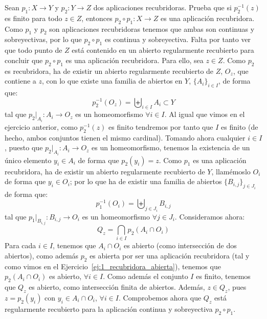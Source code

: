 \begin{ejercicio}
    Sean $p_1:X\to Y$ y $p_2:Y\to Z$ dos aplicaciones recubridoras. Prueba que si $p_2^{-1}(z)$ es finito para todo $z\in Z$, entonces $p_2\circ p_1:X\to Z$ es una aplicación recubridora. \\
    
    Como $p_1$ y $p_2$ son aplicaciones recubridoras tenemos que ambas son continuas y sobreyectivas, por lo que $p_2\circ p_1$ es continua y sobreyectiva. Falta por tanto ver que todo punto de $Z$ está contenido en un abierto regularmente recubierto para concluir que $p_2\circ p_1$ es una aplicación recubridora. Para ello, sea $z\in Z$. Como $p_2$ es recubridora, ha de existir un abierto regularmente recubierto de $Z$, $O_z$, que contiene a $z$, con lo que existe una familia de abiertos en $Y$, $\{A_i\}_{i \in I}$, de forma que:
    \begin{equation*}
        p_2^{-1}(O_z) = \biguplus_{i \in  I}A_i\subset Y
    \end{equation*}
    tal que $p_2\big|_{A_i}:A_i\to O_z$ es un homeomorfismo $\forall i \in I$. Al igual que vimos en el ejercicio anterior, como $p_2^{-1}(z)$ es finito tendremos por tanto que $I$ es finito (de hecho, ambos conjuntos tienen el mismo cardinal). Tomando ahora cualquier $i \in I$, puesto que $p_2\big|_{A_i}:A_i\to O_z$ es un homeomorfismo, tenemos la existencia de un único elemento $y_i \in A_i$ de forma que $p_2(y_i) = z$. Como $p_1$ es una aplicación recubridora, ha de existir un abierto regularmente recubierto de $Y$, llamémoslo $O_i$ de forma que $y_i \in O_i$; por lo que ha de existir una familia de abiertos $\{B_{i,j}\}_{j \in J_i}$ de forma que:
    \begin{equation*}
        p_1^{-1}(O_i) = \biguplus_{j \in J_i}B_{i,j}
    \end{equation*}
    tal que $p_1\big|_{B_{i,j}}:B_{i,j}\to O_i$ es un homeomorfismo $\forall j\in J_i$. Consideramos ahora:
    \begin{equation*}
        Q_z = \bigcap_{i \in I}p_2(A_i \cap O_i)
    \end{equation*}
    Para cada $i \in I$, tenemos que $A_i\cap O_i$ es abierto (como intersección de dos abiertos), como además $p_2$ es abierta por ser una aplicación recubridora (tal y como vimos en el Ejercicio~\ref{ej:1_recubridora_abierta}), tenemos que $p_2(A_i\cap O_i)$ es abierto, $\forall i \in I$. Como además el conjunto $I$ es finito, tenemos que $Q_z$ es abierto, como intersección finita de abiertos. Además, $z\in Q_z$, pues $z = p_2(y_i)$ con $y_i \in A_i\cap O_i$, $\forall i \in I$. Comprobemos ahora que $Q_z$ está regularmente recubierto para la aplicación continua y sobreyectiva $p_2\circ p_1$. \\


\end{ejercicio}
